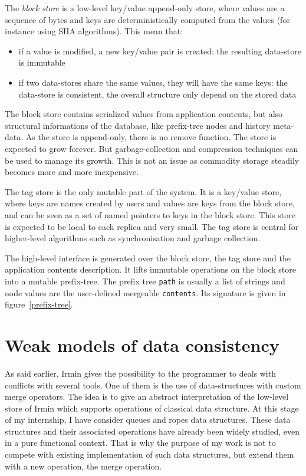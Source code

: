 \documentclass{article}
\renewcommand{\-}{\hyp}
\newcommand{\irmin}{Irmin\xspace}
\newcommand{\code}[1]{\texttt{#1}}
\begin{document}
The \emph{block store} is a low-level key/value append-only store, where values are a sequence of bytes and keys are deterministically computed from the values (for instance using SHA algorithms).
This mean that:
\begin{itemize}
	\item if a value is modified, a new key/value pair is created: the resulting data-store is immutable
	\item if two data-stores share the same values, they will have the same keys: the data-store is consistent, the overall structure only depend on the stored data
\end{itemize}
The block store contains serialized values from application contents, but also structural informations of the database, like prefix-tree nodes and history meta-data.
As the store is append-only, there is no remove function.
The store is expected to grow forever.
But garbage-collection and compression techniques can be used to manage its growth.
This is not an issue as commodity storage steadily becomes more and more inexpensive.

The tag store is the only mutable part of the system.
It is a key/value store, where keys are names created by users and values are keys from the block store, and can be seen as a set of named pointers to keys in the block store.
This store is expected to be local to each replica and very small.
The tag store is central for higher-level algorithms such as synchronisation and garbage collection.

The high-level interface is generated over the block store, the tag store and the application contents description.
It lifts immutable operations on the block store into a mutable prefix-tree.
The prefix tree \code{path} is usually a list of strings and node values are the user-defined mergeable \code{contents}. Its signature is given in figure~\ref{prefix-tree}.



\section{Weak models of data consistency}

As said earlier, \irmin gives the possibility to the programmer to deals with conflicts with several tools.
One of them is the use of data-structures with custom merge operators.
The idea is to give an abstract interpretation of the low-level store of \irmin which supports operations of classical data structure.
At this stage of my internship, I have consider queues and ropes data structures.
These data structures and their associated operations have already been widely studied, even in a pure functional context\cite{PurelyFunctionalDataStructures1996}.
That is why the purpose of my work is not to compete with existing implementation of such data structures, but extend them with a new operation, the merge operation.
\end{document}
